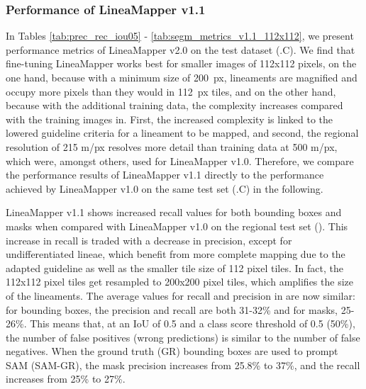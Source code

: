 \subsubsection{Performance of LineaMapper v1.1}\label{sec:LM1.1}
In Tables \ref{tab:prec_rec_iou05} - \ref{tab:segm_metrics_v1.1_112x112}, we present performance metrics of LineaMapper v2.0 on the test dataset (.C).
We find that fine-tuning LineaMapper works best for smaller images of 112x112 pixels, on the one hand, because with a minimum size of 200~px, lineaments are magnified and occupy more pixels than they would in 112~px tiles, and on the other hand, because with the additional training data, the complexity increases compared with the training images in. First, the increased complexity is linked to the lowered guideline criteria for a lineament to be mapped, and second, the regional resolution of 215 m/px resolves more detail than training data at 500 m/px, which were, amongst others, used for LineaMapper v1.0. Therefore, we compare the performance results of LineaMapper v1.1 directly to the performance achieved by LineaMapper v1.0 on the same test set (.C) in the following. 

LineaMapper v1.1 shows increased recall values for both bounding boxes and masks when compared with LineaMapper v1.0 on the regional test set (). This increase in recall is traded with a decrease in precision, except for undifferentiated lineae, which benefit from more complete mapping due to the adapted guideline as well as the smaller tile size of 112 pixel tiles. In fact, the 112x112 pixel tiles get resampled to 200x200 pixel tiles, which amplifies the size of the lineaments. The average values for recall and precision in  are now similar: for bounding boxes, the precision and recall are both 31-32\% and for masks, 25-26\%. This means that, at an IoU of 0.5 and a class score threshold of 0.5 (50\%), the number of false positives (wrong predictions) is similar to the number of false negatives. When the ground truth (GR) bounding boxes are used to prompt SAM (SAM-GR), the mask precision increases from 25.8\% to 37\%, and the recall increases from 25\% to 27\%.


